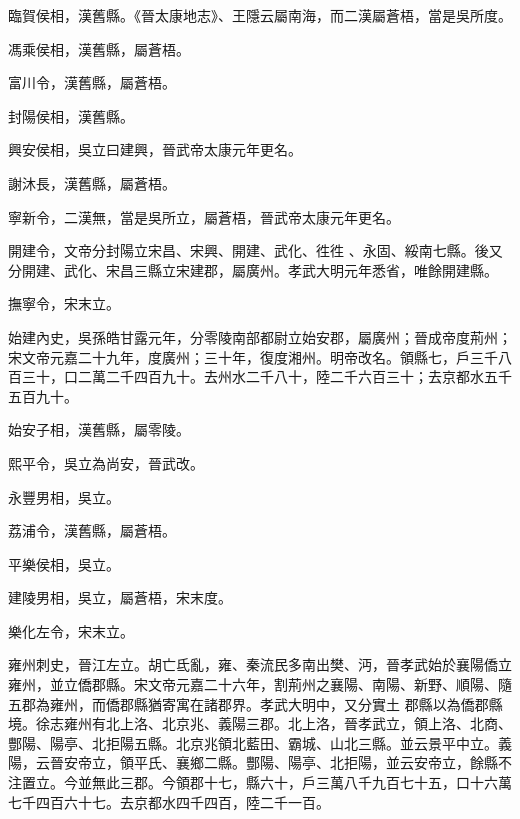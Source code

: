 \begin{pinyinscope}
 臨賀侯相，漢舊縣。《晉太康地志》、王隱云屬南海，而二漢屬蒼梧，當是吳所度。



 馮乘侯相，漢舊縣，屬蒼梧。



 富川令，漢舊縣，屬蒼梧。



 封陽侯相，漢舊縣。



 興安侯相，吳立曰建興，晉武帝太康元年更名。



 謝沐長，漢舊縣，屬蒼梧。



 寧新令，二漢無，當是吳所立，屬蒼梧，晉武帝太康元年更名。


開建令，文帝分封陽立宋昌、宋興、開建、武化、徃徃
 、永固、綏南七縣。後又分開建、武化、宋昌三縣立宋建郡，屬廣州。孝武大明元年悉省，唯餘開建縣。



 撫寧令，宋末立。



 始建內史，吳孫皓甘露元年，分零陵南部都尉立始安郡，屬廣州；晉成帝度荊州；宋文帝元嘉二十九年，度廣州；三十年，復度湘州。明帝改名。領縣七，戶三千八百三十，口二萬二千四百九十。去州水二千八十，陸二千六百三十；去京都水五千五百九十。



 始安子相，漢舊縣，屬零陵。



 熙平令，吳立為尚安，晉武改。



 永豐男相，吳立。



 荔浦令，漢舊縣，屬蒼梧。



 平樂侯相，吳立。



 建陵男相，吳立，屬蒼梧，宋末度。



 樂化左令，宋末立。



 雍州刺史，晉江左立。胡亡氐亂，雍、秦流民多南出樊、沔，晉孝武始於襄陽僑立雍州，並立僑郡縣。宋文帝元嘉二十六年，割荊州之襄陽、南陽、新野、順陽、隨五郡為雍州，而僑郡縣猶寄寓在諸郡界。孝武大明中，又分實土
 郡縣以為僑郡縣境。徐志雍州有北上洛、北京兆、義陽三郡。北上洛，晉孝武立，領上洛、北商、酆陽、陽亭、北拒陽五縣。北京兆領北藍田、霸城、山北三縣。並云景平中立。義陽，云晉安帝立，領平氏、襄鄉二縣。酆陽、陽亭、北拒陽，並云安帝立，餘縣不注置立。今並無此三郡。今領郡十七，縣六十，戶三萬八千九百七十五，口十六萬七千四百六十七。去京都水四千四百，陸二千一百。



\end{pinyinscope}
